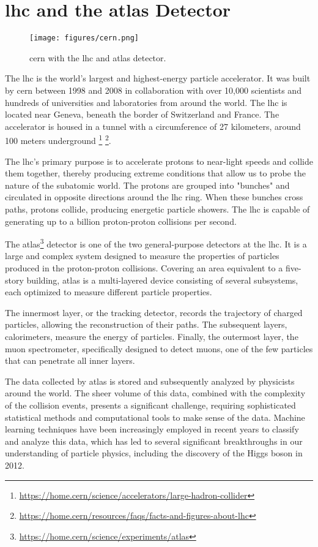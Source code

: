 \section[LHC and the ATLAS Detector]{\acrshort{lhc} and the \acrshort{atlas} Detector}

\begin{figure}[ht]
    \centering
    \texttt{[image: figures/cern.png]}
    \caption{\gls{cern} with the \gls{lhc} and \gls{atlas} detector.}
    \label{fig:cern}
\end{figure}

The \gls{lhc} is the world's largest and highest-energy particle accelerator. It was built by
\gls{cern} between 1998 and 2008 in collaboration with over 10,000 scientists and
hundreds of universities and laboratories from around the world. The \gls{lhc} is located near Geneva, beneath the border of
Switzerland and France. The accelerator is housed in a tunnel with a circumference of 27 kilometers, around 100
meters underground
\footnote{\url{https://home.cern/science/accelerators/large-hadron-collider}}
\footnote{\url{https://home.cern/resources/faqs/facts-and-figures-about-lhc}}.

The \gls{lhc}'s primary purpose is to accelerate protons to near-light speeds and collide them together, thereby producing
extreme conditions that allow us to probe the nature of the subatomic world. The protons are grouped into "bunches" and
circulated in opposite directions around the \gls{lhc} ring. When these bunches cross paths, protons collide, producing
energetic particle showers. The \gls{lhc} is capable of generating up to a billion proton-proton collisions per second.

The \gls{atlas}\footnote{\url{https://home.cern/science/experiments/atlas}} detector is one of the two general-purpose
detectors at the \gls{lhc}. It is a large and complex system designed to measure the properties of particles produced in
the proton-proton collisions. Covering an area equivalent to a five-story building, \gls{atlas} is a multi-layered
device consisting of several subsystems, each optimized to measure different particle properties.

The innermost layer, or the tracking detector, records the trajectory of charged particles, allowing the reconstruction
of their paths. The subsequent layers, calorimeters, measure the energy of particles. Finally, the outermost layer, the
muon spectrometer, specifically designed to detect muons, one of the few particles that can penetrate all inner layers.

The data collected by \gls{atlas} is stored and subsequently analyzed by physicists around the world. The sheer volume of this
data, combined with the complexity of the collision events, presents a significant challenge, requiring sophisticated
statistical methods and computational tools to make sense of the data. Machine learning techniques have been
increasingly employed in recent years to classify and analyze this data, which has led to several significant
breakthroughs in our understanding of particle physics, including the discovery of the Higgs boson in 2012.

